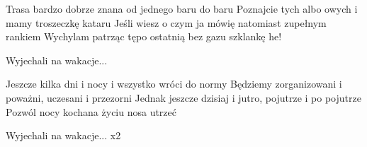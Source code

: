 \documentclass[../../../songbook.tex]{subfiles}
\begin{document}
Trasa bardzo dobrze znana od jednego baru do baru		\newline
Poznajcie tych albo owych i mamy troszeczkę kataru		\newline
Jeśli wiesz o czym ja mówię natomiast zupełnym rankiem	\newline
Wychylam patrząc tępo ostatnią bez gazu szklankę he!	\newline

\-\hspace{1cm} Wyjechali na wakacje...	\newline

Jeszcze kilka dni i nocy i wszystko wróci do normy		\newline
Będziemy zorganizowani i poważni, uczesani i przezorni	\newline
Jednak jeszcze dzisiaj i jutro, pojutrze i po pojutrze	\newline
Pozwól nocy kochana życiu nosa utrzeć					\newline

\-\hspace{1cm} Wyjechali na wakacje...     x2	\newline
\end{document}
